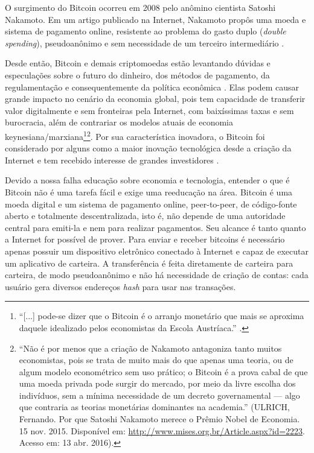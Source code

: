 O surgimento do Bitcoin ocorreu em 2008 pelo anômino cientista Satoshi Nakamoto. Em um artigo publicado na Internet, Nakamoto propôs uma moeda e sistema de pagamento online, resistente ao problema do gasto duplo (\textit{double spending}), pseudoanônimo e sem necessidade de um terceiro intermediário \cite{bib:satoshi}.

Desde então, Bitcoin e demais criptomoedas estão levantando dúvidas e especulações sobre o futuro do dinheiro, dos métodos de pagamento, da regulamentação e consequentemente da política econômica \cite{bib:fmi}. Elas podem causar grande impacto no cenário da economia global, pois tem capacidade de transferir valor digitalmente e sem fronteiras pela Internet, com baixíssimas taxas e sem burocracia, além de contrariar os modelos atuais de economia keynesiana/marxiana\footnote{``[...] pode-se dizer que o Bitcoin é o arranjo monetário que mais se aproxima daquele idealizado pelos economistas da Escola Austríaca.'' \cite[p. 66]{bib:fernando-ulrich}.}\footnote{``Não é por menos que a criação de Nakamoto antagoniza tanto muitos economistas, pois se trata de muito mais do que apenas uma teoria, ou de algum modelo econométrico sem uso prático; o Bitcoin é a prova cabal de que uma moeda privada pode surgir do mercado, por meio da livre escolha dos indivíduos, sem a mínima necessidade de um decreto governamental --- algo que contraria as teorias monetárias dominantes na academia.'' (ULRICH, Fernando. Por que Satoshi Nakamoto merece o Prêmio Nobel de Economia. 15 nov. 2015. Disponível em: \url{http://www.mises.org.br/Article.aspx?id=2223}. Acesso em: 13 abr. 2016).}. Por sua característica inovadora, o Bitcoin foi considerado por alguns como a maior inovação tecnológica desde a criação da Internet e tem recebido interesse de grandes investidores \cite{bib:atencao-investidores}.

Devido a nossa falha educação sobre economia e tecnologia, entender o que é Bitcoin não é uma tarefa fácil e exige uma reeducação na área. Bitcoin é uma moeda digital e um sistema de pagamento online, peer-to-peer, de código-fonte aberto e totalmente descentralizada, isto é, não depende de uma autoridade central para emiti-la e nem para realizar pagamentos. Seu alcance é tanto quanto a Internet for possível de prover. Para enviar e receber bitcoins é necessário apenas possuir um dispositivo eletrônico conectado à Internet e capaz de executar um aplicativo de carteira. A transferência é feita diretamente de carteira para carteira, de modo pseudoanônimo e não há necessidade de criação de contas: cada usuário gera diversos endereços \textit{hash} para usar nas transações.

